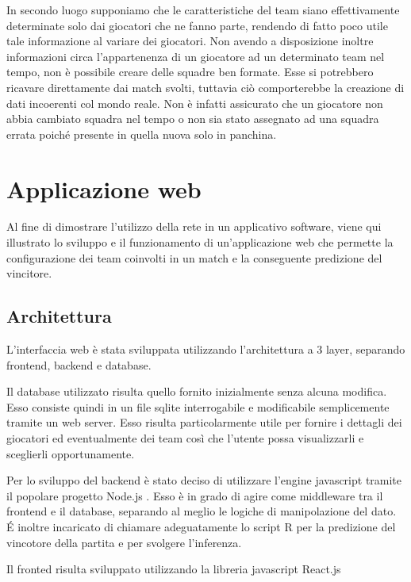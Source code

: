 \documentclass[hidelinks, 12pt]{article}
\begin{document}
In secondo luogo supponiamo che le caratteristiche del team siano effettivamente determinate solo dai giocatori che ne fanno parte, rendendo di fatto poco utile tale informazione al variare dei giocatori. Non avendo a disposizione inoltre informazioni circa l'appartenenza di un giocatore ad un determinato team nel tempo, non è possibile creare delle squadre ben formate. Esse si potrebbero ricavare direttamente dai match svolti, tuttavia ciò comporterebbe la creazione di dati incoerenti col mondo reale. Non è infatti assicurato che un giocatore non abbia cambiato squadra nel tempo o non sia stato assegnato ad una squadra errata poiché presente in quella nuova solo in panchina.


\clearpage
\section{Applicazione web}

Al fine di dimostrare l'utilizzo della rete in un applicativo software, viene qui illustrato lo sviluppo e il funzionamento di un'applicazione web che permette la configurazione dei team coinvolti in un match e la conseguente predizione del vincitore.

\subsection{Architettura}

L'interfaccia web è stata sviluppata utilizzando l'architettura a 3 layer, separando frontend, backend e database.

Il database utilizzato risulta quello fornito inizialmente senza alcuna modifica. Esso consiste quindi in un file sqlite interrogabile e modificabile semplicemente tramite un web server. Esso risulta particolarmente utile per fornire i dettagli dei giocatori ed eventualmente dei team così che l'utente possa visualizzarli e sceglierli opportunamente.

Per lo sviluppo del backend è stato deciso di utilizzare l'engine javascript tramite il popolare progetto Node.js \cite{site:nodejs}. Esso è in grado di agire come middleware tra il frontend e il database, separando al meglio le logiche di manipolazione del dato. \'E inoltre incaricato di chiamare adeguatamente lo script R per la predizione del vincotore della partita e per svolgere l'inferenza.

Il fronted risulta sviluppato utilizzando la libreria javascript React.js \cite{site:react}
\end{document}
